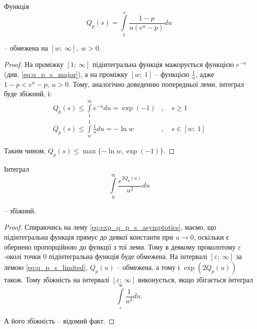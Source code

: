 \begin{lem}
	\label{eq:q_p_s_limited}
	Функція
	$$
	Q_p(s) = \int\limits_1^s \frac{1- p}{u(e^u - p)} du
	$$
	
	– обмежена на $[w; ~\infty], \; w>0$.
\end{lem}
\begin{proof}
	На проміжку $[1; ~\infty]$ підінтегральна функція мажорується функцією $e^{-u}$ (див. \eqref{eq:q_p_s_major}), а на проміжку $[w; ~1]$ – функцією $\frac{1}{u}$, адже $1- p < e^u - p, ~ u > 0$. Тому, аналогічно доведенню попередньої леми, інтеграл буде збіжний, і:
	\begin{align*}
	Q_p(s) \leq \int\limits_1^\infty e^{-u} du = \exp(-1) &,\quad s \geq 1 \\
	Q_p(s) \leq \int\limits_w^1 \frac{1}{u} du = - \ln w &, \quad s \in [w;~1]
	\end{align*}
	
	Таким чином, $Q_p(s) \leq \max\{-\ln w, \exp(-1)\}$.
\end{proof}

\begin{lem}
	Інтеграл
	$$
	\int\limits_0^\infty \frac{e^{2Q_p(u)}}{u^2} du
	$$
	
	– збіжний.
\end{lem}
\begin{proof}
	Спираючись на лему \eqref{eq:exp_q_p_s_asymptotics}, маємо, що підінтегральна функція прямує до деякої константи при $u \rightarrow 0$, оскільки є обернено пропорційною до функції з тої леми. Тому в деякому проколотому $\varepsilon$-околі точки 0 підінтегральна функція буде обмежена. На інтервалі $[\varepsilon; ~\infty]$ за лемою \eqref{eq:q_p_s_limited}, $Q_p(u)$ – обмежена, а тому і $\exp(2Q_p(u))$ також. Тому збіжність на інтервалі $[\varepsilon; ~\infty]$ виконується, якщо збігається інтеграл
	\[
	\int\limits_\varepsilon^\infty \frac{1}{u^2} du.
	\]
	
	А його збіжність – відомий факт.
\end{proof}

